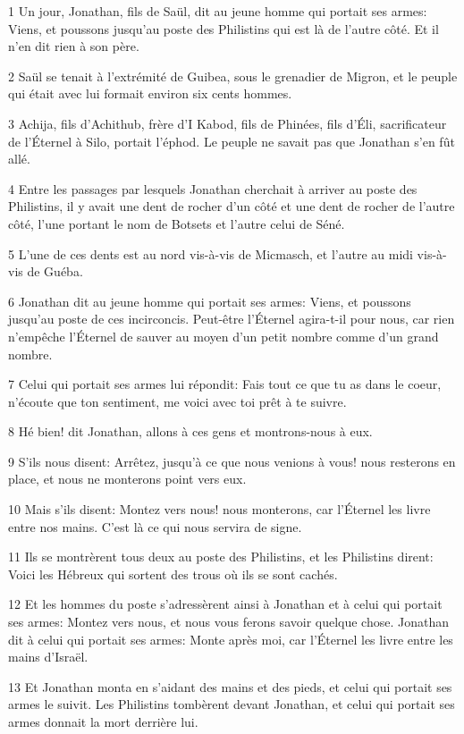 \par 1 Un jour, Jonathan, fils de Saül, dit au jeune homme qui portait ses armes: Viens, et poussons jusqu'au poste des Philistins qui est là de l'autre côté. Et il n'en dit rien à son père.
\par 2 Saül se tenait à l'extrémité de Guibea, sous le grenadier de Migron, et le peuple qui était avec lui formait environ six cents hommes.
\par 3 Achija, fils d'Achithub, frère d'I Kabod, fils de Phinées, fils d'Éli, sacrificateur de l'Éternel à Silo, portait l'éphod. Le peuple ne savait pas que Jonathan s'en fût allé.
\par 4 Entre les passages par lesquels Jonathan cherchait à arriver au poste des Philistins, il y avait une dent de rocher d'un côté et une dent de rocher de l'autre côté, l'une portant le nom de Botsets et l'autre celui de Séné.
\par 5 L'une de ces dents est au nord vis-à-vis de Micmasch, et l'autre au midi vis-à-vis de Guéba.
\par 6 Jonathan dit au jeune homme qui portait ses armes: Viens, et poussons jusqu'au poste de ces incirconcis. Peut-être l'Éternel agira-t-il pour nous, car rien n'empêche l'Éternel de sauver au moyen d'un petit nombre comme d'un grand nombre.
\par 7 Celui qui portait ses armes lui répondit: Fais tout ce que tu as dans le coeur, n'écoute que ton sentiment, me voici avec toi prêt à te suivre.
\par 8 Hé bien! dit Jonathan, allons à ces gens et montrons-nous à eux.
\par 9 S'ils nous disent: Arrêtez, jusqu'à ce que nous venions à vous! nous resterons en place, et nous ne monterons point vers eux.
\par 10 Mais s'ils disent: Montez vers nous! nous monterons, car l'Éternel les livre entre nos mains. C'est là ce qui nous servira de signe.
\par 11 Ils se montrèrent tous deux au poste des Philistins, et les Philistins dirent: Voici les Hébreux qui sortent des trous où ils se sont cachés.
\par 12 Et les hommes du poste s'adressèrent ainsi à Jonathan et à celui qui portait ses armes: Montez vers nous, et nous vous ferons savoir quelque chose. Jonathan dit à celui qui portait ses armes: Monte après moi, car l'Éternel les livre entre les mains d'Israël.
\par 13 Et Jonathan monta en s'aidant des mains et des pieds, et celui qui portait ses armes le suivit. Les Philistins tombèrent devant Jonathan, et celui qui portait ses armes donnait la mort derrière lui.

